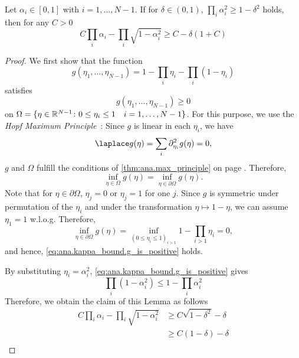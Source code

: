 \begin{lemma}%
  \label{lem:ana.kappa_bound}
  Let $\alpha_i \in [0,1]$ with $i = 1, \ldots, N - 1$.
  If for $\delta \in (0, 1)$, $\prod_i \alpha_i^2 \ge 1 - \delta^2$ holds, then for any $C > 0$
  \[
    C \prod_i \alpha_i - \prod_i \sqrt{1 - \alpha_i^2} \ge C  - \delta (1 + C)
  \]
\end{lemma}
\begin{proof}
  We first show that the function
  \[
    g(\eta_1, \ldots, \eta_{N-1}) = 1 - \prod_i \eta_i - \prod_i \left( 1 - \eta_i \right)
  \]
  satisfies
  \[
    \label{eq:ana.kappa_bound.g_is_positive}
    g(\eta_1, \ldots, \eta_{N-1}) \ge 0
  \]
  on $\Omega = \{\eta \in {\mathbb{R}}^{N - 1}\colon 0 \le \eta_i \le 1 \quad i = 1, \ldots, N - 1\}$.
  For this purpose, we use the \emph{Hopf Maximum Principle}~\cite{Taylor}:
  Since $g$ is linear in each $\eta_i$, we have
  \[
    \laplace g (\eta) = \sum_i \partial_{\eta_i}^2 g (\eta) = 0,
  \]
  $g$ and $\Omega$ fulfill the conditions of \cref{thm:ana.max_principle} on page \pageref{thm:ana.max_principle}.
  Therefore,
  \[
    \inf_{\eta \in \Omega} g(\eta) = \inf_{\eta \in \partial \Omega} g(\eta).
  \]
  Note that for $\eta \in \partial \Omega$, $\eta_j = 0$ or $\eta_j = 1$ for one $j$.
  Since $g$ is symmetric under permutation of the $\eta_i$ and under the transformation $\eta \mapsto 1 - \eta$, we can assume $\eta_1 = 1$ w.l.o.g.
  Therefore,
  \[
    \inf_{\eta \in \partial \Omega} g(\eta) = \inf_{{(0 \le \eta_i \le 1)}_{i > 1}} 1 - \prod_{i > 1} \eta_i = 0,
  \]
  and hence, \cref{eq:ana.kappa_bound.g_is_positive} holds.

  By substituting $\eta_i = \alpha_i^2$, \cref{eq:ana.kappa_bound.g_is_positive} gives
  \[
    \label{eq:ana.kappa_bound.sqrt_to_prod}
    \prod_i \left( 1 - \alpha_i^2 \right) \le 1 - \prod_i \alpha_i^2
  \]
  Therefore, we obtain the claim of this Lemma as follows
  \begin{align}
    C \prod_i \alpha_i - \prod_i \sqrt{1 - \alpha_i^2}
    &\ge C \sqrt{1 - \delta^2} - \delta \\
    &\ge C \left(1 - \delta\right) - \delta \\
  \end{align}
\end{proof}
